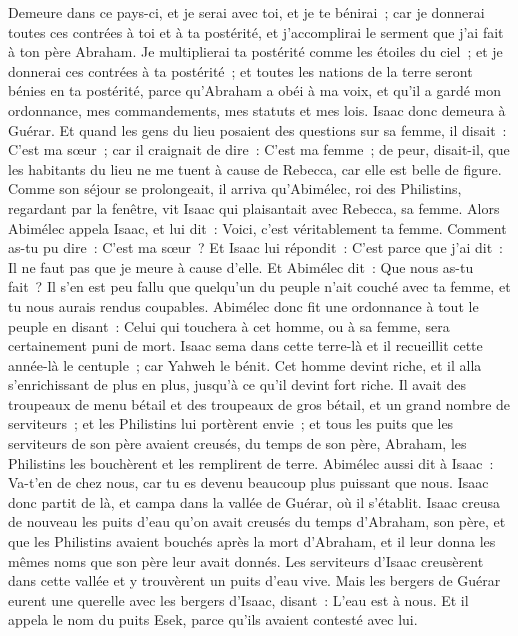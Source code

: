 \begin{multicols}{2}
Demeure dans ce pays-ci, et je serai avec toi, et je te bénirai~; car je donnerai toutes ces contrées à toi et à ta postérité, et j'accomplirai le serment que j'ai fait à ton père Abraham.
Je multiplierai ta postérité comme les étoiles du ciel~; et je donnerai ces contrées à ta postérité~; et toutes les nations de la terre seront bénies en ta postérité,
parce qu'Abraham a obéi à ma voix, et qu'il a gardé mon ordonnance, mes commandements, mes statuts et mes lois.
Isaac donc demeura à Guérar.
Et quand les gens du lieu posaient des questions sur sa femme, il disait~: C'est ma sœur~; car il craignait de dire~: C'est ma femme~; de peur, disait-il, que les habitants du lieu ne me tuent à cause de Rebecca, car elle est belle de figure.
Comme son séjour se prolongeait, il arriva qu'Abimélec, roi des Philistins, regardant par la fenêtre, vit Isaac qui plaisantait avec Rebecca, sa femme.
Alors Abimélec appela Isaac, et lui dit~: Voici, c'est véritablement ta femme. Comment as-tu pu dire~: C'est ma sœur~? Et Isaac lui répondit~: C'est parce que j'ai dit~: Il ne faut pas que je meure à cause d'elle.
Et Abimélec dit~: Que nous as-tu fait~? Il s'en est peu fallu que quelqu'un du peuple n'ait couché avec ta femme, et tu nous aurais rendus coupables.
Abimélec donc fit une ordonnance à tout le peuple en disant~: Celui qui touchera à cet homme, ou à sa femme, sera certainement puni de mort.
Isaac sema dans cette terre-là et il recueillit cette année-là le centuple~; car Yahweh le bénit.
Cet homme devint riche, et il alla s'enrichissant de plus en plus, jusqu'à ce qu'il devint fort riche.
Il avait des troupeaux de menu bétail et des troupeaux de gros bétail, et un grand nombre de serviteurs~; et les Philistins lui portèrent envie~;
et tous les puits que les serviteurs de son père avaient creusés, du temps de son père, Abraham, les Philistins les bouchèrent et les remplirent de terre.
Abimélec aussi dit à Isaac~: Va-t'en de chez nous, car tu es devenu beaucoup plus puissant que nous.
Isaac donc partit de là, et campa dans la vallée de Guérar, où il s'établit.
Isaac creusa de nouveau les puits d'eau qu'on avait creusés du temps d'Abraham, son père, et que les Philistins avaient bouchés après la mort d'Abraham, et il leur donna les mêmes noms que son père leur avait donnés.
Les serviteurs d'Isaac creusèrent dans cette vallée et y trouvèrent un puits d'eau vive.
Mais les bergers de Guérar eurent une querelle avec les bergers d'Isaac, disant~: L'eau est à nous. Et il appela le nom du puits Esek, parce qu'ils avaient contesté avec lui.

\end{multicols}
